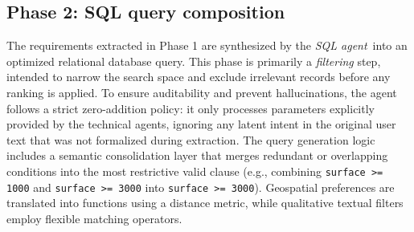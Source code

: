 \documentclass[runningheads,orivec]{llncs}
\newcommand{\sqlagent}{\textit{SQL agent}}
\begin{document}
\subsection{Phase 2: SQL query composition}
\label{sec:methods_phase2}
The requirements extracted in Phase 1 are synthesized by the \sqlagent\ into an optimized relational database query.
This phase is primarily a \emph{filtering} step, intended to narrow the search space and exclude irrelevant records before any ranking is applied.
To ensure auditability and prevent hallucinations, the agent follows a strict zero-addition policy: it only processes parameters explicitly provided by the technical agents, ignoring any latent intent in the original user text that was not formalized during extraction.
The query generation logic includes a semantic consolidation layer that merges redundant or overlapping conditions into the most restrictive valid clause (e.g., combining \texttt{surface >= 1000} and \texttt{surface >= 3000} into \texttt{surface >= 3000}).
Geospatial preferences are translated into functions using a distance metric, while qualitative textual filters employ flexible matching operators.




\end{document}
